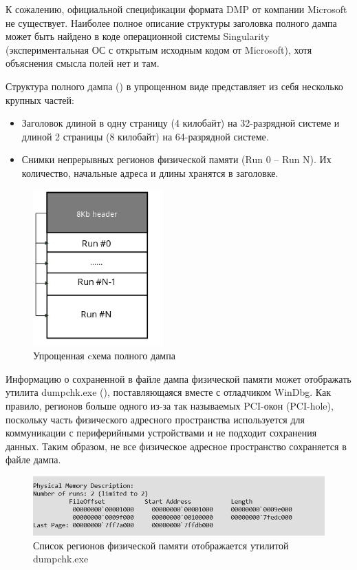 \documentclass{mipt-thesis-bs}
\begin{document}
К сожалению, официальной спецификации формата DMP от компании Microsoft не существует. Наиболее полное описание структуры заголовка полного дампа может быть найдено в коде операционной системы Singularity (экспериментальная ОС с открытым исходным кодом от Microsoft)\cite{mssing}, хотя объяснения смысла полей нет и там.

Структура полного дампа () в упрощенном виде представляет из себя несколько крупных частей:

\begin{itemize}
    \item Заголовок длиной в одну страницу (4 килобайт) на 32-разрядной системе и длиной 2 страницы (8 килобайт) на 64-разрядной системе.
    \item Снимки непрерывных регионов физической памяти (Run 0 -- Run N). Их количество, начальные адреса и длины хранятся в заголовке.
\end{itemize}

\begin{figure}[h]
\begin{center}
    \includegraphics[width=5cm]{dmp_scheme1.png}
    \caption{Упрощенная cхема полного дампа}
    \label{fig:dmp-scheme}
\end{center}
\end{figure}

Информацию о сохраненной в файле дампа физической памяти может отображать утилита dumpchk.exe (), поставляющаяся вместе с отладчиком WinDbg. Как правило, регионов больше одного из-за так называемых PCI-окон (PCI-hole), поскольку часть физического адресного пространства используется для коммуникации с периферийными устройствами и не подходит сохранения данных. Таким образом, не все физическое адресное пространство сохраняется в файле дампа.

\begin{figure}[h]
\begin{center}
    \includegraphics[width=1\textwidth]{runs.png}
    \caption{Список регионов физической памяти отображается утилитой dumpchk.exe}
    \label{fig:runs}
\end{center}
\end{figure}
\end{document}
